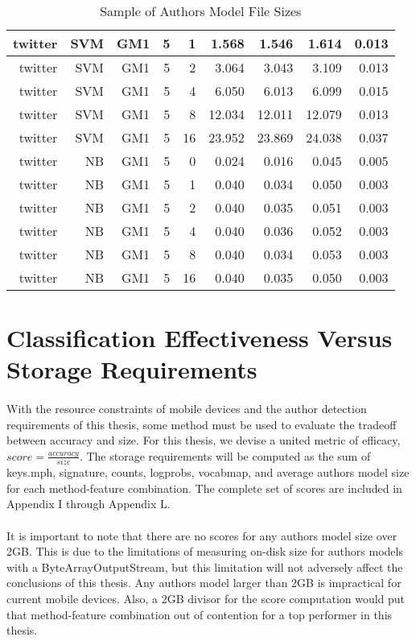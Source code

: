 \begin{table}[htbp!]
\begin{center}
\begin{tabular}{ | r | r | r | r | r | r | r | r | r | }
		twitter & SVM & GM1 & 5 & 1 & 1.568 & 1.546 & 1.614 & 0.013\\ \hline 
		twitter & SVM & GM1 & 5 & 2 & 3.064 & 3.043 & 3.109 & 0.013\\ \hline 
		twitter & SVM & GM1 & 5 & 4 & 6.050 & 6.013 & 6.099 & 0.015\\ \hline 
		twitter & SVM & GM1 & 5 & 8 & 12.034 & 12.011 & 12.079 & 0.013\\ \hline 
		twitter & SVM & GM1 & 5 & 16 & 23.952 & 23.869 & 24.038 & 0.037\\ \hline 
		twitter & NB & GM1 & 5 & 0 & 0.024 & 0.016 & 0.045 & 0.005\\ \hline 
		twitter & NB & GM1 & 5 & 1 & 0.040 & 0.034 & 0.050 & 0.003\\ \hline 
		twitter & NB & GM1 & 5 & 2 & 0.040 & 0.035 & 0.051 & 0.003\\ \hline 
		twitter & NB & GM1 & 5 & 4 & 0.040 & 0.036 & 0.052 & 0.003\\ \hline 
		twitter & NB & GM1 & 5 & 8 & 0.040 & 0.034 & 0.053 & 0.003\\ \hline 
		twitter & NB & GM1 & 5 & 16 & 0.040 & 0.035 & 0.050 & 0.003\\ \hline 
		\end{tabular}
		\caption{Sample of Authors Model File Sizes}
		\label{tab:sample_authors_model_sizes}
		\end{center}
	\end{table}

\section{Classification Effectiveness Versus Storage Requirements}
\paragraph*{} With the resource constraints of mobile devices and the author detection requirements of this thesis, some method must be used to evaluate the tradeoff between accuracy and size.  For this thesis, we devise a united metric of efficacy, $score=\frac{accuracy}{size}$.  The storage requirements will be computed as the sum of keys.mph, signature, counts, logprobs, vocabmap, and average authors model size for each method-feature combination.  The complete set of scores are included in Appendix I through Appendix L.  

\paragraph*{}It is important to note that there are no scores for any authors model size over 2GB.  This is due to the limitations of measuring on-disk size for authors models with a ByteArrayOutputStream, but this limitation will not adversely affect the conclusions of this thesis.  Any authors model larger than 2GB is impractical for current mobile devices.  Also, a 2GB divisor for the score computation would put that method-feature combination out of contention for a top performer in this thesis.

